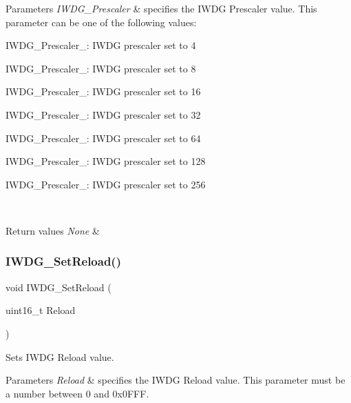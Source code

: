 \begin{DoxyParams}{Parameters}
{\em I\+W\+D\+G\+\_\+\+Prescaler} & specifies the I\+W\+DG Prescaler value. This parameter can be one of the following values\+: \begin{DoxyItemize}
\item I\+W\+D\+G\+\_\+\+Prescaler\+\_\+: I\+W\+DG prescaler set to 4 \item I\+W\+D\+G\+\_\+\+Prescaler\+\_\+: I\+W\+DG prescaler set to 8 \item I\+W\+D\+G\+\_\+\+Prescaler\+\_\+: I\+W\+DG prescaler set to 16 \item I\+W\+D\+G\+\_\+\+Prescaler\+\_\+: I\+W\+DG prescaler set to 32 \item I\+W\+D\+G\+\_\+\+Prescaler\+\_\+: I\+W\+DG prescaler set to 64 \item I\+W\+D\+G\+\_\+\+Prescaler\+\_\+: I\+W\+DG prescaler set to 128 \item I\+W\+D\+G\+\_\+\+Prescaler\+\_\+: I\+W\+DG prescaler set to 256 \end{DoxyItemize}
\\
\hline
\end{DoxyParams}

\begin{DoxyRetVals}{Return values}
{\em None} & \\
\hline
\end{DoxyRetVals}
\mbox{\label{group___i_w_d_g___private___functions_gae2a14752a0431f23cb80cebf202ac365}} 
\subsubsection{\texorpdfstring{IWDG\_SetReload()}{IWDG\_SetReload()}}
{\footnotesize\ttfamily void I\+W\+D\+G\+\_\+\+Set\+Reload (\begin{DoxyParamCaption}\item[{uint16\+\_\+t}]{Reload }\end{DoxyParamCaption})}



Sets I\+W\+DG Reload value. 


\begin{DoxyParams}{Parameters}
{\em Reload} & specifies the I\+W\+DG Reload value. This parameter must be a number between 0 and 0x0\+F\+FF. \\
\hline
\end{DoxyParams}

